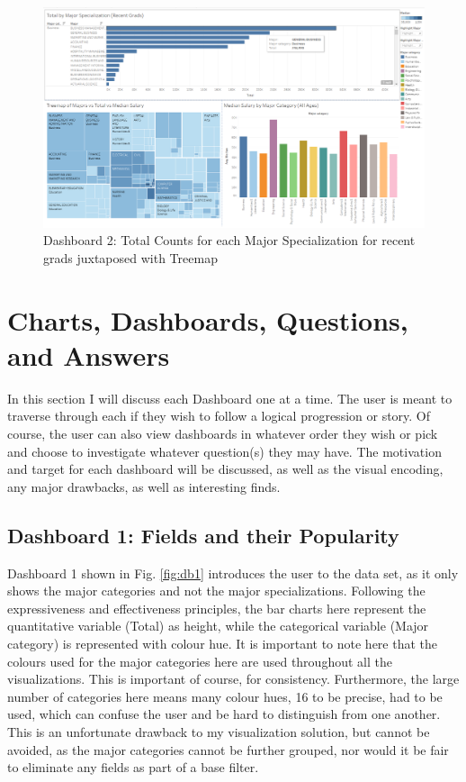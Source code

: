 \documentclass[sigchi]{acmart}
\begin{document}
  \begin{figure}[thpb]
  \includegraphics[width=1.0\textwidth]{DB2.png}
     \caption{Dashboard 2: Total Counts for each Major Specialization for recent grads juxtaposed with Treemap}
         \label{fig:db2}
  \end{figure}
  
\section{Charts, Dashboards, Questions, and Answers}

In this section I will discuss each Dashboard one at a time. The user is meant to traverse through each if they wish to follow a logical progression or story. Of course, the user can also view dashboards in whatever order they wish or pick and choose to investigate whatever question(s) they may have. The motivation and target for each dashboard will be discussed, as well as the visual encoding, any major drawbacks, as well as interesting finds.

\subsection{Dashboard 1: Fields and their Popularity}
\label{sec:db1}

Dashboard 1 shown in Fig. \ref{fig:db1} introduces the user to the data set, as it only shows the major categories and not the major specializations. Following the expressiveness and effectiveness principles, the bar charts here represent the quantitative variable (Total) as height, while the categorical variable (Major category) is represented with colour hue. It is important to note here that the colours used for the major categories here are used throughout all the visualizations. This is important of course, for consistency. Furthermore, the large number of categories here means many colour hues, 16 to be precise, had to be used, which can confuse the user and be hard to distinguish from one another. This is an unfortunate drawback to my visualization solution, but cannot be avoided, as the major categories cannot be further grouped, nor would it be fair to eliminate any fields as part of a base filter. 
\end{document}
